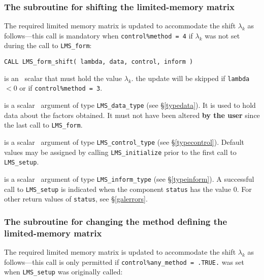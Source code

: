 \documentclass{galahad}
\newcommand{\packagename}{LMS}
\begin{document}

\subsubsection{The subroutine for shifting the limited-memory matrix}
The required limited memory matrix is updated to accommodate the
shift $\lambda_k$ as follows---this call is mandatory when
{\tt control\%method = 4} if $\lambda_k$ was not set during the
call to {\tt \packagename\_form}:
\vspace*{1mm}

\hspace{8mm}
{\tt CALL \packagename\_form\_shift( lambda, data, control, inform )}

\vspace*{-3mm}
\begin{description}
 is an \intentin\ \realdp scalar that must hold the value
$\lambda_k$.
\restriction the update will be skipped if {\tt lambda} $< 0$
or if {\tt control\%method = 3}.

 is a scalar \intentinout\ argument of type
{\tt \packagename\_data\_type}
(see \S\ref{typedata}). It is used to hold data about the factors obtained.
It must not have been altered {\bf by the user} since the last call to
{\tt \packagename\_form}.

 is a scalar \intentin\ argument of type
{\tt \packagename\_control\_type}
(see \S\ref{typecontrol}). Default values may be assigned by calling
{\tt \packagename\_initialize} prior to the first call to
{\tt \packagename\_setup}.

 is a scalar \intentout\ argument of type
{\tt \packagename\_inform\_type}
(see \S\ref{typeinform}). A successful call to
{\tt \packagename\_setup}
is indicated when the  component {\tt status} has the value 0.
For other return values of {\tt status}, see \S\ref{galerrors}.

\end{description}


\subsubsection{The subroutine for changing the method defining the
limited-memory matrix}
The required limited memory matrix is updated to accommodate the
shift $\lambda_k$ as follows---this call is only permitted if
{\tt control\%any\_method = .TRUE.} was set when
{\tt \packagename\_setup} was originally called:
\vspace*{1mm}
\end{document}
